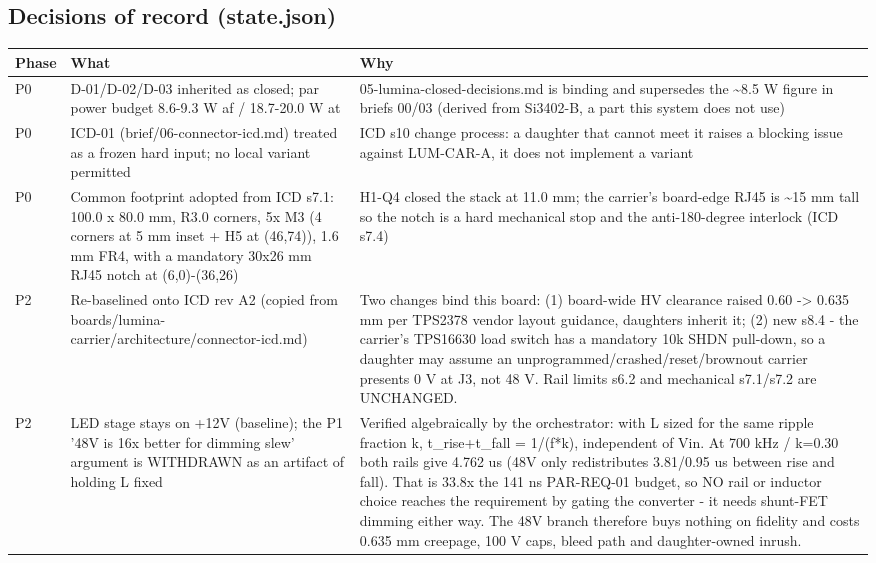 \documentclass[11pt,a4paper]{article}
\begin{document}
\subsection*{Decisions of record (state.json)}
{\small
\begin{longtable}{lp{5.2cm}p{7.2cm}}
\toprule
\textbf{Phase} & \textbf{What} & \textbf{Why} \\
\midrule
\endhead
P0 & D-01/D-02/D-03 inherited as closed; par power budget 8.6-9.3 W af / 18.7-20.0 W at & 05-lumina-closed-decisions.md is binding and supersedes the \textasciitilde{}8.5 W figure in briefs 00/03 (derived from Si3402-B, a part this system does not use) \\
P0 & ICD-01 (brief/06-connector-icd.md) treated as a frozen hard input; no local variant permitted & ICD s10 change process: a daughter that cannot meet it raises a blocking issue against LUM-CAR-A, it does not implement a variant \\
P0 & Common footprint adopted from ICD s7.1: 100.0 x 80.0 mm, R3.0 corners, 5x M3 (4 corners at 5 mm inset + H5 at (46,74)), 1.6 mm FR4, with a mandatory 30x26 mm RJ45 notch at (6,0)-(36,26) & H1-Q4 closed the stack at 11.0 mm; the carrier's board-edge RJ45 is \textasciitilde{}15 mm tall so the notch is a hard mechanical stop and the anti-180-degree interlock (ICD s7.4) \\
P2 & Re-baselined onto ICD rev A2 (copied from boards/lumina-carrier/architecture/connector-icd.md) & Two changes bind this board: (1) board-wide HV clearance raised 0.60 -\textgreater{} 0.635 mm per TPS2378 vendor layout guidance, daughters inherit it; (2) new s8.4 - the carrier's TPS16630 load switch has a mandatory 10k SHDN pull-down, so a daughter may assume an unprogrammed/crashed/reset/brownout carrier presents 0 V at J3, not 48 V. Rail limits s6.2 and mechanical s7.1/s7.2 are UNCHANGED. \\
P2 & LED stage stays on +12V (baseline); the P1 '48V is 16x better for dimming slew' argument is WITHDRAWN as an artifact of holding L fixed & Verified algebraically by the orchestrator: with L sized for the same ripple fraction k, t\_rise+t\_fall = 1/(f{*}k), independent of Vin. At 700 kHz / k=0.30 both rails give 4.762 us (48V only redistributes 3.81/0.95 us between rise and fall). That is 33.8x the 141 ns PAR-REQ-01 budget, so NO rail or inductor choice reaches the requirement by gating the converter - it needs shunt-FET dimming either way. The 48V branch therefore buys nothing on fidelity and costs 0.635 mm creepage, 100 V caps, bleed path and daughter-owned inrush. \\

\end{longtable}}
\end{document}
